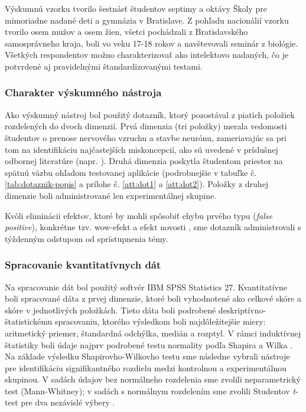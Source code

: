 Výskumnú vzorku tvorilo šestnásť študentov septimy a oktávy Školy pre mimoriadne nadané deti a gymnázia v Bratislave. Z pohľadu nacionálií vzorku tvorilo osem mužov a osem žien, všetci pochádzali z Bratislavského samosprávneho 
kraja, boli vo veku 17-18 rokov a navštevovali seminár z biológie. Všetkých respondentov možno charakterizovať ako intelektovo nadaných, čo je potvrdené aj pravidelnými štandardizovanými testami.

\subsubsection{Charakter výskumného nástroja}
Ako výskumný nástroj bol použitý dotazník, ktorý pozostával z piatich položiek rozdelených do dvoch dimenzií. Prvá dimenzia (tri položky) merala vedomosti študentov o prenose nervového vzruchu a stavbe neurónu, zameriavajúc sa 
pri tom na identifikáciu najčastejších miskoncepcií, ako sú uvedené v príslušnej odbornej literatúre (napr. \cite{nagyovaMiskoncepcieZiakovOblasti2016, vijapurkarWhatCellsReally2014, odomActionPotentialsBiology1993}).  
Druhá dimenzia poskytla študentom priestor na spätnú väzbu ohľadom testovanej aplikácie (podrobnejšie v tabuľke č. \ref{tab:dotaznik-popis} a prílohe č. \ref{att:dot1} a \ref{att:dot2}). Položky z druhej dimenzie boli administrované len 
experimentálnej skupine.

Kvôli eliminácii efektov, ktoré by mohli spôsobiť chybu prvého typu (\emph{false positive}), konkrétne tzv. wow-efekt a efekt novosti \cite{turekDidaktika2014, petlakVseobecnaDidaktika2016}, sme dotazník administrovali s 
týždenným odstupom od sprístupnenia témy.


\subsubsection{Spracovanie kvantitatívnych dát}
Na spracovanie dát bol použitý softvér IBM SPSS Statistics 27. Kvantitatívne boli spracované dáta z prvej dimenzie, ktoré boli vyhodnotené ako celkové skóre a skóre v jednotlivých položkách.
Tieto dáta boli podrobené deskriptívno-štatistickému spracovaniu, ktorého výsledkom boli najdôležitejšie miery: aritmetický priemer, štandardná odchýlka, 
medián a rozptyl. V rámci induktívnej štatistiky boli údaje najprv podrobené testu normality podľa Shapira a Wilka \cite{mohdrazaliPowerComparisonsShapirowilk2011, komendaAnalyzaNahodnehoPedagogickem1981, shapiroAnalysisVarianceTest1965}.
Na základe výsledku Shapirovho-Wilkovho testu sme následne vybrali nástroje pre identifikáciu signifikantného rozdielu medzi kontrolnou a experimentálnou skupinou. V sadách údajov bez normálneho rozdelenia sme zvolili 
neparametrický test (Mann-Whitney); v sadách s normálnym rozdelením sme zvolili Studentov \emph{t}-test pre dva nezávislé výbery \cite{svecMetodologieVedVychove2009,komendaAnalyzaNahodnehoPedagogickem1981,proksaMetodologiaPedagogickehoVyskumu2008}. 

